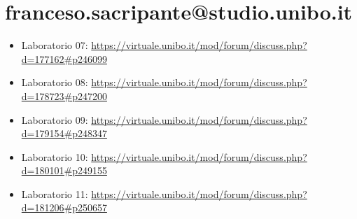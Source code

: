 \documentclass[a4paper,12pt]{report}
\begin{document}
\section{franceso.sacripante@studio.unibo.it}
\begin{itemize}
	\item Laboratorio 07: \url{https://virtuale.unibo.it/mod/forum/discuss.php?d=177162#p246099}
	\item Laboratorio 08: \url{https://virtuale.unibo.it/mod/forum/discuss.php?d=178723#p247200}
	\item Laboratorio 09: \url{https://virtuale.unibo.it/mod/forum/discuss.php?d=179154#p248347}
	\item Laboratorio 10: \url{https://virtuale.unibo.it/mod/forum/discuss.php?d=180101#p249155}
	\item Laboratorio 11: \url{https://virtuale.unibo.it/mod/forum/discuss.php?d=181206#p250657}
\end{itemize}




\end{document}

